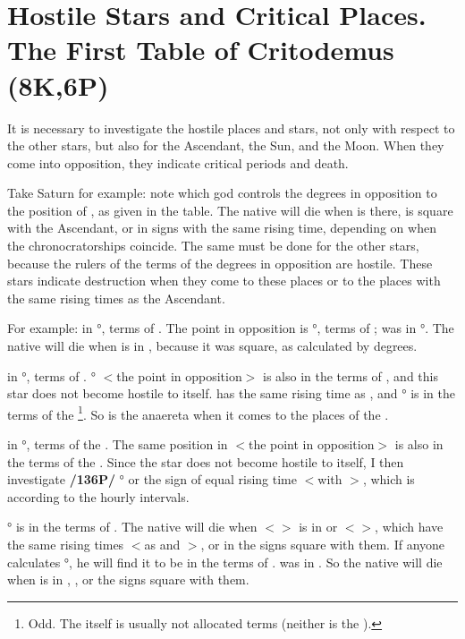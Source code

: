 \section{Hostile Stars and Critical Places. The First Table of Critodemus (8K,6P)}

It is necessary to investigate the hostile places and stars, not only with respect to the other stars, but also for the Ascendant, the Sun, and the Moon. When they come into opposition, they indicate critical periods and death. 

Take Saturn for example: note which god controls the degrees in opposition to the position of \Saturn, as given in the table. The native will die when \Saturn\xspace is there, is square with the Ascendant, or in signs with the same rising time, depending on when the chronocratorships coincide. The
same must be done for the other stars, because the rulers of the terms of the degrees in opposition are hostile. These stars indicate destruction when they come to these places or to the places with the same rising times as the Ascendant.

For example: \Saturn\xspace in \Cancer\xspace 21°, terms of \Venus. The point in opposition is \Capricorn\xspace 21°, terms
of \Mars; \Mars\xspace was in \Taurus\xspace 27°. The native will die when \Saturn\xspace is in \Virgo, because it was square, as calculated by degrees.

\Jupiter\xspace in \Scorpio\xspace 14°, terms of \Saturn. \Taurus\xspace 14° $<$the point in opposition$>$ is also in the terms of \Saturn, and this star does not become hostile to itself. \Leo\xspace has the same rising time as \Scorpio, and \Leo\xspace 14° is in the terms of the \Sun\footnote{Odd. The \Sun\xspace itself is usually not allocated terms (neither is the \Moon).}. So \Jupiter\xspace is the anaereta when it comes to the places of the \Sun.

\Mars\xspace in \Taurus\xspace 27°, terms of the \Sun. The same position in \Scorpio\xspace $<$the point in opposition$>$ is also in the terms of the \Sun. Since the star does not become hostile to itself, I then investigate \textbf{/136P/} \Leo\xspace 27° or the sign of equal rising time $<$with \Taurus$>$, which is \Gemini\xspace according to the hourly intervals.

\Gemini\xspace 27° is in the terms of \Venus. The native will die when $<$\Mars$>$ is in \Scorpio\xspace or $<$\Pisces$>$, which have the same rising times $<$as \Leo\xspace and \Taurus$>$, or in the signs square with them. If anyone calculates \Leo\xspace 27°, he will find it to be in the terms of \Saturn. \Saturn\xspace was in \Cancer. So the native will die when \Mars\xspace is in \Cancer, \Sagittarius, or the signs square with them.

